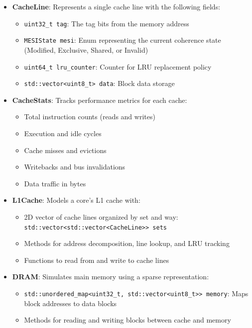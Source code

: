 \documentclass[11pt,a4paper]{article}
\begin{document}
    \begin{itemize}[leftmargin=*]
        \item \textbf{CacheLine}: Represents a single cache line with the following fields:
        \begin{itemize}
            \item \texttt{uint32\_t tag}: The tag bits from the memory address
            \item \texttt{MESIState mesi}: Enum representing the current coherence state (Modified, Exclusive, Shared, or Invalid)
            \item \texttt{uint64\_t lru\_counter}: Counter for LRU replacement policy
            \item \texttt{std::vector<uint8\_t> data}: Block data storage
        \end{itemize}
        
        \item \textbf{CacheStats}: Tracks performance metrics for each cache:
        \begin{itemize}
            \item Total instruction counts (reads and writes)
            \item Execution and idle cycles
            \item Cache misses and evictions
            \item Writebacks and bus invalidations
            \item Data traffic in bytes
        \end{itemize}
        
        \item \textbf{L1Cache}: Models a core's L1 cache with:
        \begin{itemize}
            \item 2D vector of cache lines organized by set and way: \texttt{std::vector<std::vector<CacheLine>> sets}
            \item Methods for address decomposition, line lookup, and LRU tracking
            \item Functions to read from and write to cache lines
        \end{itemize}
        
        \item \textbf{DRAM}: Simulates main memory using a sparse representation:
        \begin{itemize}
            \item \texttt{std::unordered\_map<uint32\_t, std::vector<uint8\_t>> memory}: Maps block addresses to data blocks
            \item Methods for reading and writing blocks between cache and memory
        \end{itemize}
        

\end{itemize}
\end{document}
